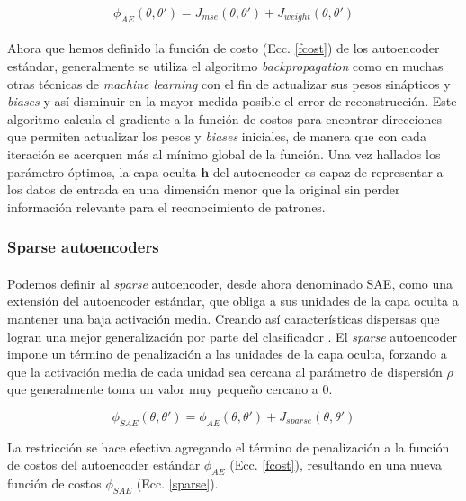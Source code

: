 \documentclass[12pt]{article}%
\begin{document}
\begin{equation}
\label{fcost}
\phi_{AE}(\theta,\theta')= J_{mse}(\theta,\theta') + J_{weight}(\theta,\theta')
\end{equation} 

\paragraph{}
Ahora que hemos definido la función de costo (Ecc. \ref{fcost}) de los autoencoder estándar, generalmente se utiliza el algoritmo \textit{backpropagation} como en muchas otras técnicas de \textit{machine learning} con el fin de actualizar sus pesos sinápticos y \textit{biases} y así disminuir en la mayor medida posible el error de reconstrucción. Este algoritmo calcula el gradiente a la función de costos para encontrar direcciones que permiten actualizar los pesos y \textit{biases} iniciales, de manera que con cada iteración se acerquen más al mínimo global de la función. Una vez hallados los parámetro óptimos, la capa oculta $\textbf{h}$ del autoencoder es capaz de representar a los datos de entrada en una dimensión menor que la original sin perder información relevante para el reconocimiento de patrones.

\subsubsection{Sparse autoencoders}

\paragraph{}
Podemos definir al \textit{sparse} autoencoder, desde ahora denominado SAE, como una extensión del autoencoder estándar, que obliga a sus unidades de la capa oculta a mantener una baja activación media. Creando así características dispersas que logran una mejor generalización por parte del clasificador \cite{du}. El \textit{sparse} autoencoder impone un término de penalización a las unidades de la capa oculta, forzando a que la activación media de cada unidad sea cercana al parámetro de dispersión $\rho$ que generalmente toma un valor muy pequeño cercano a 0. 

\begin{equation}
\label{sparse}
\phi_{SAE}(\theta,\theta')=\phi_{AE}(\theta,\theta')+J_{sparse}(\theta,\theta')
\end{equation}

La restricción se hace efectiva agregando el término de penalización a la función de costos del autoencoder estándar $\phi_{AE}$ (Ecc. \ref{fcost}), resultando en una nueva función de costos $\phi_{SAE}$ (Ecc. \ref{sparse}).
\end{document}

